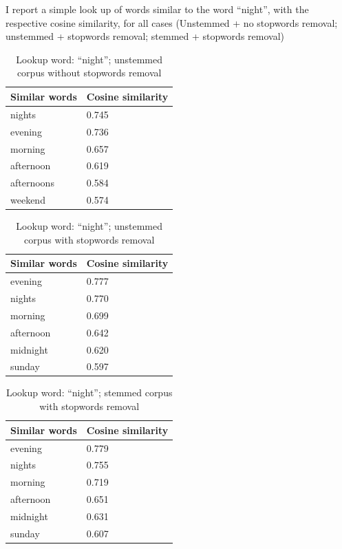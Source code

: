 I report a simple look up of words similar to the word ``night'', with the respective cosine similarity, for all cases (Unstemmed + no stopwords removal; unstemmed + stopwords removal; stemmed + stopwords removal)

\begin{table}[H]
\centering
\begin{tabular}{ll}
\textbf{Similar words} & \textbf{Cosine similarity} \\ \hline  
nights & 0.745 \\
evening & 0.736\\
morning & 0.657 \\
afternoon & 0.619 \\
afternoons & 0.584 \\
weekend & 0.574 \\
\end{tabular}
\caption{Lookup word: ``night''; unstemmed corpus without stopwords removal}
\end{table}

\begin{table}[H]
\centering
\begin{tabular}{ll}
\textbf{Similar words} & \textbf{Cosine similarity} \\ \hline  
evening & 0.777 \\
nights & 0.770 \\
morning & 0.699 \\
afternoon & 0.642 \\
midnight & 0.620 \\
sunday & 0.597 \\
\end{tabular}
\caption{Lookup word: ``night''; unstemmed corpus with stopwords removal}
\end{table}

\begin{table}[H]
\centering
\begin{tabular}{ll}
\textbf{Similar words} & \textbf{Cosine similarity} \\ \hline  
evening & 0.779 \\
nights & 0.755 \\
morning & 0.719 \\
afternoon & 0.651 \\
midnight & 0.631 \\
sunday & 0.607 \\
\end{tabular}
\caption{Lookup word: ``night''; stemmed corpus with stopwords removal}
\end{table}

